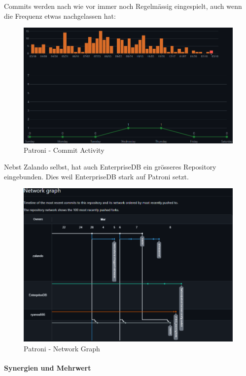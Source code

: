 \begin{flushleft}
    Commits werden nach wie vor immer noch Regelmässig eingespielt, auch wenn die Frequenz etwas nachgelassen hat:
    \begin{figure}[H]
        \centering
        \includegraphics[width=0.75\linewidth]{source/implementation/evaluation/postgresql_ha_solutions/insights/patroni/commit_activity_zalando_patroni}
        \caption{Patroni - Commit Activity}
        \label{fig:commit_activity_zalando_patroni}
    \end{figure}

    Nebst Zalando selbst, hat auch EnterpriseDB\cite{LNF967SI} ein grösseres Repository eingebunden.
    Dies weil EnterpriseDB stark auf Patroni setzt.
     \begin{figure}[H]
        \centering
        \includegraphics[width=0.75\linewidth]{source/implementation/evaluation/postgresql_ha_solutions/insights/patroni/networkgraph_zalando_patroni}
        \caption{Patroni - Network Graph}
        \label{fig:networkgraph_zalando_patroni}
    \end{figure}
\end{flushleft}
\begin{flushleft}
    \paragraph{Synergien und Mehrwert}
\end{flushleft}